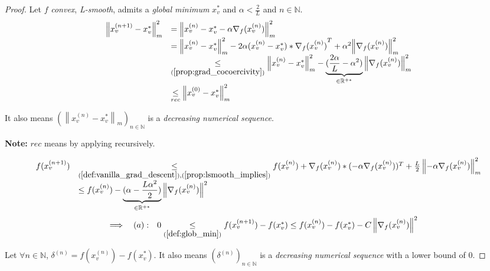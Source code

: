 \documentclass[11pt,en]{elegantpaper}
\newcommand{\norm}[1]{\left\lVert#1\right\rVert}
\newcommand{\Real}{\mathbb{R}}
\begin{document}
\begin{proof}
  Let $f$ \textit{convex}, \textit{L-smooth}, admits a \textit{global minimum} $x_v^*$ and $\alpha < \frac{2}{L}$ and $n \in \mathbb{N}$.
  \begin{equation*}
    \begin{array}{ll}
      \norm{x_v^{(n+1)} - x_v^*}^2_m  & = \norm{x_v^{(n)} - x_v^* - \alpha {\nabla_f(x_v^{(n)})}}^2_m \\
      & = \norm{x_v^{(n)} - x_v^*}^2_m - 2\alpha (x_v^{(n)} - x_v^*)*{\nabla_f(x_v^{(n)})}^T + \alpha^2 {\norm{\nabla_f(x_v^{(n)})}^2_m} \\
      & \underset{(\ref{prop:grad_cocoercivity})}{\leq} \norm{x_v^{(n)} - x_v^*}^2_m
        - \underbrace{(\frac{2\alpha}{L} - \alpha^2)}_{\in \Real^{+*}} {\norm{\nabla_f(x_v^{(n)})}^2_m} \\
      & \underset{rec}{\leq} \norm{x_v^{(0)} - x_v^*}^2_m
    \end{array}
  \end{equation*} \par
  It also means $(\norm{x_v^{(n)} - x_v^*}_m)_{n \in \mathbb{N}}$ is a \textit{decreasing numerical sequence}. \par
  \textbf{Note:} $rec$ means by applying recursively.

  \begin{equation*}
    \begin{array}{ll}
      f(x_v^{(n+1)}) & \underset{(\ref{def:vanilla_grad_descent}),(\ref{prop:lsmooth_implies})}{\leq} f(x_v^{(n)}) + \nabla_f(x_v^{(n)}) * (-\alpha \nabla_f(x_v^{(n)}))^T + \frac{L}{2} \norm{- \alpha \nabla_f(x_v^{(n)})}_m^2 \\
      & \leq f(x_v^{(n)}) - \underbrace{(\alpha - \frac{L \alpha^2}{2})}_{\in \Real^{+*}} \norm{\nabla_f(x_v^{(n)})}^2
    \end{array}
  \end{equation*}
  \begin{equation*}
    \begin{array}{llll}
      & \implies & (a) : & 0 \underset{(\ref{def:glob_min})}{\leq} f(x_v^{(n+1)}) - f(x_v^*) \leq f(x_v^{(n)}) - f(x_v^*) - C \norm{\nabla_f(x_v^{(n)})}^2
    \end{array}
  \end{equation*} \par
  Let $\forall n \in \mathbb{N}$, $\delta^{(n)} = f(x_v^{(n)}) - f(x_v^*)$.
  It also means $(\delta^{(n)})_{n \in \mathbb{N}}$ is a \textit{decreasing numerical sequence} with a lower bound of $0$. \par


\end{proof}
\end{document}
